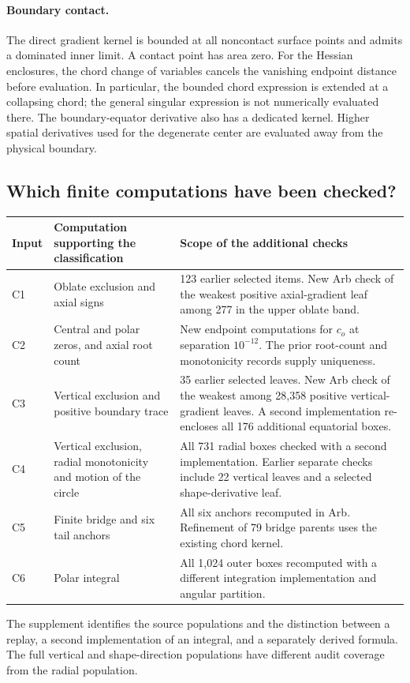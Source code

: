 \paragraph{Boundary contact.}
The direct gradient kernel is bounded at all noncontact surface points
and admits a dominated inner limit.  A contact point has area zero.
For the Hessian enclosures, the chord change of variables cancels
the vanishing endpoint distance before evaluation.  In particular,
the bounded chord expression is extended at a collapsing chord;
the general singular expression is not numerically evaluated there.
The boundary-equator derivative also has a dedicated kernel.
Higher spatial derivatives used for the degenerate center are evaluated
away from the physical boundary.

\subsection{Which finite computations have been checked?}
\label{subsec:computational-workload}
\begin{center}\small
\begin{tabularx}{\linewidth}{lXX}\toprule
Input & Computation supporting the classification & Scope of the additional checks\\\midrule
C1 & Oblate exclusion and axial signs & 123 earlier selected items. New Arb check of the weakest positive axial-gradient leaf among 277 in the upper oblate band.\\
C2 & Central and polar zeros, and axial root count & New endpoint computations for $c_o$ at separation $10^{-12}$. The prior root-count and monotonicity records supply uniqueness.\\
C3 & Vertical exclusion and positive boundary trace & 35 earlier selected leaves. New Arb check of the weakest among 28,358 positive vertical-gradient leaves. A second implementation re-encloses all 176 additional equatorial boxes.\\
C4 & Vertical exclusion, radial monotonicity and motion of the circle & All 731 radial boxes checked with a second implementation. Earlier separate checks include 22 vertical leaves and a selected shape-derivative leaf.\\
C5 & Finite bridge and six tail anchors & All six anchors recomputed in Arb. Refinement of 79 bridge parents uses the existing chord kernel.\\
C6 & Polar integral & All 1,024 outer boxes recomputed with a different integration implementation and angular partition.\\\bottomrule
\end{tabularx}\end{center}
The supplement identifies the source populations and the distinction between a replay, a second implementation of an integral, and a separately derived formula. The full vertical and shape-direction populations have different audit coverage from the radial population.
